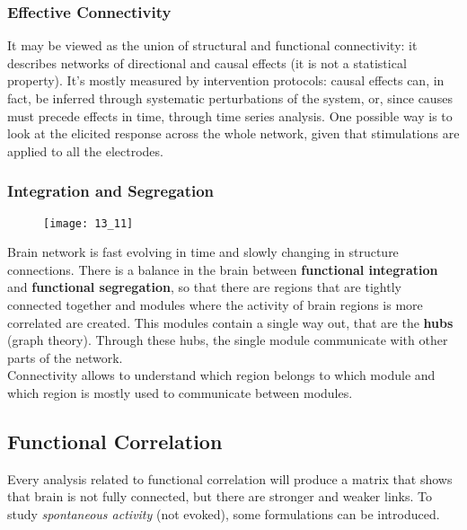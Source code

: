 \subsubsection{Effective Connectivity}
\begin{figure}[H]
    \centering
    \subfigure[]{\texttt{[image: 13\_7]}} 
    \subfigure[]{\texttt{[image: 13\_10]}}
\end{figure}
It may be viewed as the union of structural and functional connectivity: it describes networks of directional and causal effects (it is not a statistical property). It's mostly measured by intervention protocols: causal effects can, in fact, be inferred through systematic perturbations of the system, or, since causes must precede effects in time, through time series analysis.
One possible way is to look at the elicited response across the whole network, given that stimulations are applied to all the electrodes.
\subsubsection{Integration and Segregation}
\begin{figure}[H]
    \centering
    \texttt{[image: 13\_11]}
\end{figure}
Brain network is fast evolving in time and slowly changing in structure connections. 
There is a balance in the brain between \textbf{functional integration} and \textbf{functional segregation}, so that there are regions that are tightly connected together and modules where the activity of brain regions is more correlated are created. 
This modules contain a single way out, that are the \textbf{hubs} (graph theory). 
Through these hubs, the single module communicate with other parts of the network.\\
Connectivity allows to understand which region belongs to which module and which region is mostly used to communicate between modules.

\subsection{Functional Correlation}
Every analysis related to functional correlation will produce a matrix that shows that brain is not fully connected, but there are stronger and weaker links.
To study \textit{spontaneous activity} (not evoked), some formulations can be introduced.
